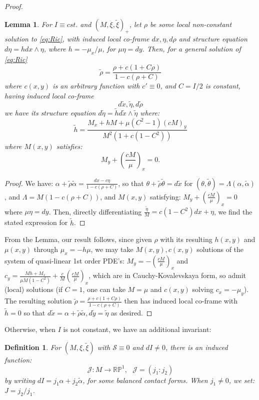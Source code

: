 \documentclass[10pt]{amsart}
\newtheorem{lem}[thm]{Lemma}
\theoremstyle{definition}
\newtheorem{dfn}{Definition}
\begin{document}
\begin{proof}
\begin{lem}
    For $I\equiv cst.$ and $(M, \xi, \tilde\xi)_+$, let $\rho$ be some local non-constant solution to \eqref{eq:Ric}, with induced local co-frame  $dx,  \eta, d\rho$ and structure equation $d\eta = h dx\wedge\eta$, where $h = - \mu_x/\mu$, for $\mu\eta = dy$. Then, for a general solution of \eqref{eq:Ric}
    \[ \tilde\rho = \frac{\rho + c(1+C\rho)}{1 - c(\rho + C) } \]
    where $c(x,y)$ is an arbitrary function with $c' \equiv 0$, and $C= I/2$ is constant, having induced local co-frame 
    \[ d\tilde x, \tilde \eta, d\tilde\rho\]
    we have its structure equation $d\tilde\eta = \tilde h d\tilde x\wedge \tilde\eta$ where:
    \[ \tilde h = \frac{M_x + hM + \mu (C^2 - 1)(cM)_y}{M^2 (1 + c(1-C^2))} \] %
    where $M(x,y)$ satisfies: 
    \[ M_y + \left( \frac{cM}{\mu } \right)_x = 0.\]
\end{lem}

\begin{proof}
    We have: $\alpha + \tilde\rho \tilde\alpha = \frac{dx - c\eta}{1 - c(\rho +C)}$, so that $\theta + \tilde\rho \tilde \theta = d\tilde x$ for $(\theta,\tilde \theta) = \Lambda(\alpha, \tilde\alpha)$, and $\Lambda = M ( 1 - c(\rho + C))$, and $M(x,y)$ satisfying: $M_y + \left( \frac{cM}{\mu } \right)_x = 0$ where $\mu\eta = dy$. Then, directly differentiating $\frac{\tilde\eta}{M} = c(1 - C^2)dx + \eta$, we find the stated expression for $\tilde h$.
\end{proof}

From the Lemma, our result follows, since given $\rho$ with its resulting $h(x,y)$ and $\mu(x,y)$ through $\mu_x = - h\mu$, we may take $M(x,y), c(x,y)$ solutions of the system of quasi-linear 1st order PDE's: $M_y = - \left( \frac{cM}{\mu } \right)_x$ and $c_y = \frac{Mh + M_x}{\mu M(1-C^2)} + \frac{c}{M}\left(\frac{cM}{\mu}\right)_x$, which are in Cauchy-Kovalevskaya form, so admit (local) solutions (if $C = 1$, one can take $M = \mu$ and $c(x,y)$ solving $c_x = - \mu_y$). The resulting solution $\tilde\rho = \frac{\rho + c(1+C\rho)}{1 - c(\rho + C) }$ then has induced local co-frame with $\tilde h = 0$  so that $d\tilde x = \alpha + \tilde\rho \tilde\alpha, d\tilde y = \tilde\eta$ as desired.
\end{proof}


Otherwise, when $I$ is not constant, we have an additional invariant:
\begin{dfn}\label{def:Jinv}
    {\em For $(M, \xi, \tilde \xi)$ with $\mathcal{S} \equiv 0$ and $dI\ne 0$, there is an induced function:
    \[ \mathcal{J}: M \to \mathbb{RP}^1, ~~~\mathcal{J} = (j_1: j_2) \]
    by writing $dI = j_1\alpha + j_2 \tilde\alpha$, for some balanced contact forms. When $j_1\ne 0$, we set: $J = j_2/j_1$.}
\end{dfn}
\end{document}
